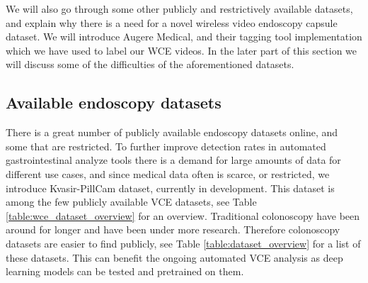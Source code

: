 \documentclass[thesis.tex]{subfiles}
\begin{document}
We will also go through some other publicly and restrictively available datasets, and explain why there is a need for a novel wireless video endoscopy capsule dataset. We will introduce Augere Medical, and their tagging tool implementation which we have used to label our WCE videos. In the later part of this section we will discuss some of the difficulties of the aforementioned datasets.



\subsection{Available endoscopy datasets}
There is a great number of publicly available endoscopy datasets online, and some that are restricted. To further improve detection rates in automated gastrointestinal analyze tools there is a demand for large amounts of data for different use cases, and since medical data often is scarce, or restricted, we introduce Kvasir-PillCam dataset, currently in development. This dataset is among the few publicly available VCE datasets, see Table \ref{table:wce_dataset_overview} for an overview. 
Traditional colonoscopy have been around for longer and have been under more research. Therefore colonoscopy datasets are easier to find publicly, see Table \ref{table:dataset_overview} for a list of these datasets. This can benefit the ongoing automated VCE analysis as deep learning models can be tested and pretrained on them.
\end{document}
